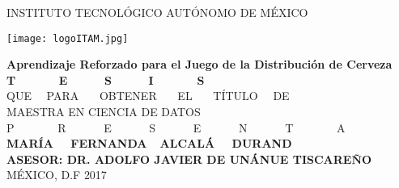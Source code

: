 
\begin{titlepage}
\begin{center}
\Large {INSTITUTO TECNOLÓGICO AUTÓNOMO DE MÉXICO}

 \vspace{0.5 cm}
  \centering
    \texttt{[image: logoITAM.jpg]}

 \vspace{0.5 cm}
 \textbf{Aprendizaje Reforzado para el Juego de la Distribuci\'on de Cerveza}
  \vspace{2 cm}\\
  \Huge{\textbf{T \ \ \ \ \ \ E \ \ \ \ \ S \ \ \ \ \ I \ \ \ \ \ \ S}}
    \vspace{.4cm}\\
  \Large{QUE  \ \ PARA \ \ \ OBTENER \ \ \ EL \ \ \ TÍTULO \ \ DE 
   \vspace{.4cm}\\
  MAESTRA EN CIENCIA DE DATOS 
   \vspace{.4cm}\\
  P \ \ \ \ \ \ \ R \ \ \ \ \ \ E \ \ \ \ \ \ S \ \ \ \ \ \ E \ \ \ \ \ \ N \ \ \ \ \ \ T \ \ \ \ \ \ \ A 
   \vspace{.4cm}\\
 \textbf{MAR\'IA \ \ FERNANDA\ \ ALCAL\'A \ \ DURAND}}
    \vspace{1 cm}\\
\normalsize \textbf{ASESOR: DR. ADOLFO JAVIER DE UN\'ANUE TISCARE\~NO}
\vspace{1cm}\\
MÉXICO, D.F \hfill{2017}
\end{center}
\end{titlepage}

